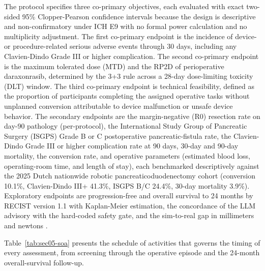 The protocol specifies three co-primary objectives, each evaluated with exact
two-sided 95\% Clopper-Pearson confidence intervals because the design is
descriptive and non-confirmatory under ICH E9 with no formal power calculation and
no multiplicity adjustment. The first co-primary endpoint is the incidence of
device- or procedure-related serious adverse events through 30 days, including any
Clavien-Dindo Grade III or higher complication. The second co-primary endpoint is
the maximum tolerated dose (MTD) and the RP2D of perioperative daraxonrasib,
determined by the 3+3 rule across a 28-day dose-limiting toxicity (DLT) window. The
third co-primary endpoint is technical feasibility, defined as the proportion of
participants completing the assigned operative tasks without unplanned conversion
attributable to device malfunction or unsafe device behavior. The secondary
endpoints are the margin-negative (R0) resection rate on day-90 pathology
(per-protocol), the International Study Group of Pancreatic Surgery (ISGPS) Grade B
or C postoperative pancreatic-fistula rate, the Clavien-Dindo Grade III or higher
complication rate at 90 days, 30-day and 90-day mortality, the conversion rate, and
operative parameters (estimated blood loss, operating-room time, and length of
stay), each benchmarked descriptively against the 2025 Dutch nationwide robotic
pancreaticoduodenectomy cohort (conversion 10.1\%, Clavien-Dindo III+ 41.3\%, ISGPS
B/C 24.4\%, 30-day mortality 3.9\%). Exploratory endpoints are progression-free and
overall survival to 24 months by RECIST version 1.1 with Kaplan-Meier estimation,
the concordance of the LLM advisory with the hard-coded safety gate, and the
sim-to-real gap in millimeters and newtons \cite{daraxwhipple,oncotrialllm}.

Table~\ref{tab:sec05-soa} presents the schedule of activities that governs the
timing of every assessment, from screening through the operative episode and the
24-month overall-survival follow-up.

